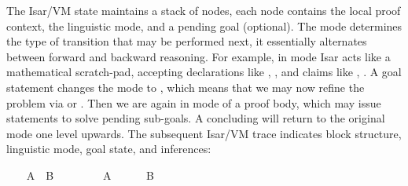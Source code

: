 \begin{isabellebody}
\begin{isamarkuptext}
  \medskip The Isar/VM state maintains a stack of nodes, each node
  contains the local proof context, the linguistic mode, and a pending
  goal (optional).  The mode determines the type of transition that
  may be performed next, it essentially alternates between forward and
  backward reasoning.  For example, in  mode Isar acts
  like a mathematical scratch-pad, accepting declarations like
  \hyperlink{command.fix}{\mbox{}}, \hyperlink{command.assume}{\mbox{}}, and claims like \hyperlink{command.have}{\mbox{}},
  \hyperlink{command.show}{\mbox{}}.  A goal statement changes the mode to , which means that we may now refine the problem via
  \hyperlink{command.unfolding}{\mbox{}} or \hyperlink{command.proof}{\mbox{}}.  Then we are again in
   mode of a proof body, which may issue \hyperlink{command.show}{\mbox{}} statements to solve pending sub-goals.  A concluding \hyperlink{command.qed}{\mbox{}} will return to the original  mode one level
  upwards.  The subsequent Isar/VM trace indicates block structure,
  linguistic mode, goal state, and inferences:%
\end{isamarkuptext}%
\isamarkuptrue%
%
\isadelimproof
%
\endisadelimproof
%
\isatagproof
%
\begin{minipage}[t]{0.15\textwidth}
\ \ \isamarkupfalse%
\ {\isachardoublequoteopen}A\ {\isasymlongrightarrow}\ B{\isachardoublequoteclose}\isanewline
\ \ \isamarkupfalse%
\isanewline
\ \ \ \ \isamarkupfalse%
\ A\isanewline
\ \ \ \ \isamarkupfalse%
\ B\isanewline
\ \ \ \ \ \ \isamarkupfalse%
\isanewline
\ \ \isamarkupfalse%
%
\end{minipage}\quad
\begin{minipage}[t]{0.07\textwidth}
 \\
\\
\\
 \\
 \\
 \\

\end{minipage}
\end{isabellebody}
